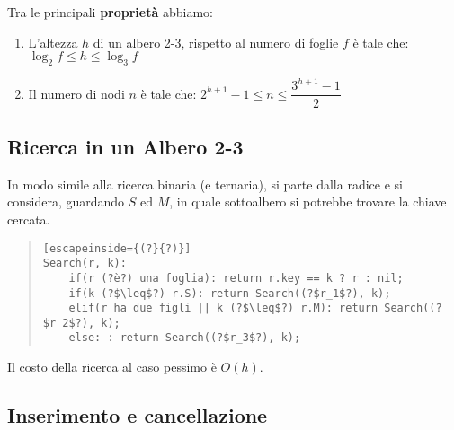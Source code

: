 \documentclass[a4paper,10pt]{article}
\theoremstyle{definition}
\begin{document}
Tra le principali \textbf{proprietà} abbiamo:
\begin{enumerate}
 \item L'altezza $h$ di un albero 2-3, rispetto al numero di foglie $f$ è tale che:
 $\log_2 f\leq h \leq \log_3 f$
 \item Il numero di nodi $n$ è tale che:
$2^{h+1}-1 \leq n \leq \dfrac{3^{h+1} - 1}{2}$
\end{enumerate}
\subsection{Ricerca in un Albero 2-3}
In modo simile alla ricerca binaria (e ternaria), si parte dalla radice e si considera, guardando $S$ ed $M$, in quale sottoalbero si potrebbe trovare la chiave cercata.

\begin{quote}
 \begin{lstlisting}[escapeinside={(?}{?)}]
Search(r, k):
    if(r (?è?) una foglia): return r.key == k ? r : nil;
    if(k (?$\leq$?) r.S): return Search((?$r_1$?), k);
    elif(r ha due figli || k (?$\leq$?) r.M): return Search((?$r_2$?), k);
    else: : return Search((?$r_3$?), k);
 \end{lstlisting}
\end{quote}

Il costo della ricerca al caso pessimo è $O(h)$.

\subsection{Inserimento e cancellazione}
\end{document}

